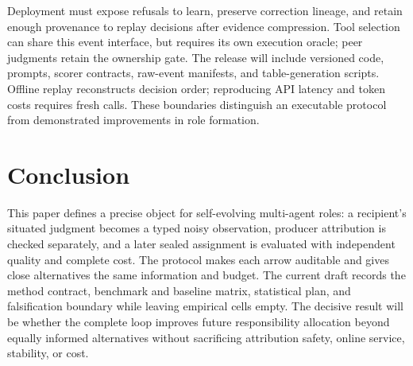 \documentclass[sigconf,anonymous]{aamas}
\begin{document}
Deployment must expose refusals to learn, preserve correction lineage, and retain enough provenance to replay decisions after evidence compression. Tool selection can share this event interface, but requires its own execution oracle; peer judgments retain the ownership gate. The release will include versioned code, prompts, scorer contracts, raw-event manifests, and table-generation scripts. Offline replay reconstructs decision order; reproducing API latency and token costs requires fresh calls. These boundaries distinguish an executable protocol from demonstrated improvements in role formation.

\section{Conclusion}

This paper defines a precise object for self-evolving multi-agent roles: a recipient's situated judgment becomes a typed noisy observation, producer attribution is checked separately, and a later sealed assignment is evaluated with independent quality and complete cost. The protocol makes each arrow auditable and gives close alternatives the same information and budget. The current draft records the method contract, benchmark and baseline matrix, statistical plan, and falsification boundary while leaving empirical cells empty. The decisive result will be whether the complete loop improves future responsibility allocation beyond equally informed alternatives without sacrificing attribution safety, online service, stability, or cost.

\balance
\clearpage


\end{document}
